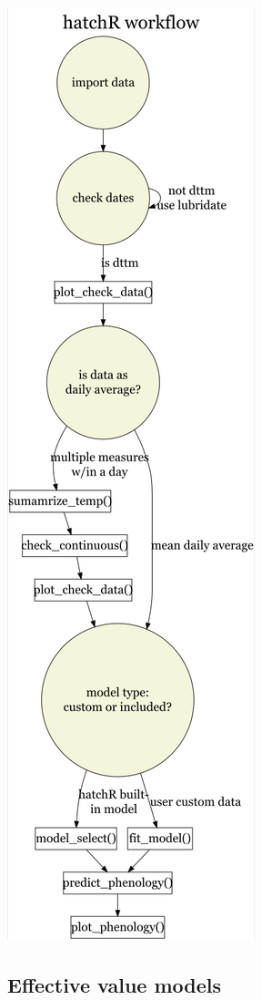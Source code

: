 \documentclass[10pt,a4paper,onecolumn]{article}
\begin{document}
\includegraphics{flowchart.png}

\subsection{Effective value models}\label{effective-value-models}
\end{document}
